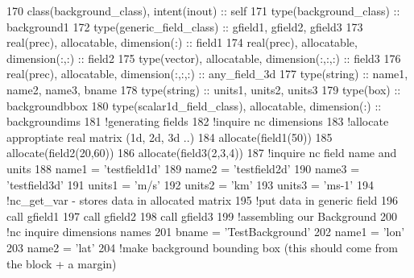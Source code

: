 \begin{DoxyCode}
170     \textcolor{keywordtype}{class}(background\_class), \textcolor{keywordtype}{intent(inout)} :: self
171     \textcolor{keywordtype}{type}(background\_class) :: background1
172     \textcolor{keywordtype}{type}(generic\_field\_class) :: gfield1, gfield2, gfield3
173     \textcolor{keywordtype}{real(prec)}, \textcolor{keywordtype}{allocatable}, \textcolor{keywordtype}{dimension(:)} :: field1
174     \textcolor{keywordtype}{real(prec)}, \textcolor{keywordtype}{allocatable}, \textcolor{keywordtype}{dimension(:,:)} :: field2
175     \textcolor{keywordtype}{type}(vector), \textcolor{keywordtype}{allocatable}, \textcolor{keywordtype}{dimension(:,:,:)} :: field3
176     \textcolor{keywordtype}{real(prec)}, \textcolor{keywordtype}{allocatable}, \textcolor{keywordtype}{dimension(:,:,:)} :: any\_field\_3d
177     \textcolor{keywordtype}{type}(string) :: name1, name2, name3, bname
178     \textcolor{keywordtype}{type}(string) :: units1, units2, units3
179     \textcolor{keywordtype}{type}(box) :: backgroundbbox
180     \textcolor{keywordtype}{type}(scalar1d\_field\_class), \textcolor{keywordtype}{allocatable}, \textcolor{keywordtype}{dimension(:)} :: backgroundims
181     \textcolor{comment}{!generating fields}
182     \textcolor{comment}{!inquire nc dimensions}
183     \textcolor{comment}{!allocate approptiate real matrix (1d, 2d, 3d ..)}
184     \textcolor{keyword}{allocate}(field1(50))
185     \textcolor{keyword}{allocate}(field2(20,60))
186     \textcolor{keyword}{allocate}(field3(2,3,4))
187     \textcolor{comment}{!inquire nc field name and units}
188     name1 = \textcolor{stringliteral}{'testfield1d'}
189     name2 = \textcolor{stringliteral}{'testfield2d'}
190     name3 = \textcolor{stringliteral}{'testfield3d'}
191     units1 = \textcolor{stringliteral}{'m/s'}
192     units2 = \textcolor{stringliteral}{'km'}
193     units3 = \textcolor{stringliteral}{'ms-1'}
194     \textcolor{comment}{!nc\_get\_var - stores data in allocated matrix}
195     \textcolor{comment}{!put data in generic field}
196     \textcolor{keyword}{call }gfield1%
197     \textcolor{keyword}{call }gfield2%
198     \textcolor{keyword}{call }gfield3%
199     \textcolor{comment}{!assembling our Background}
200     \textcolor{comment}{!nc inquire dimensions names}
201     bname = \textcolor{stringliteral}{'TestBackground'}
202     name1 = \textcolor{stringliteral}{'lon'}
203     name2 = \textcolor{stringliteral}{'lat'}
204     \textcolor{comment}{!make background bounding box (this should come from the block + a margin)}

\end{DoxyCode}

